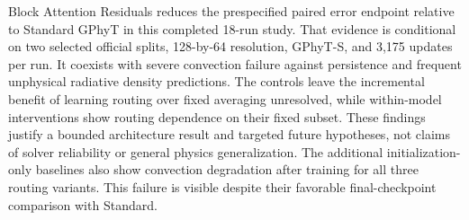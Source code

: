 Block Attention Residuals reduces the prespecified paired error endpoint relative to Standard GPhyT in this completed 18-run study. That evidence is conditional on two selected official splits, 128-by-64 resolution, GPhyT-S, and 3,175 updates per run. It coexists with severe convection failure against persistence and frequent unphysical radiative density predictions. The controls leave the incremental benefit of learning routing over fixed averaging unresolved, while within-model interventions show routing dependence on their fixed subset. These findings justify a bounded architecture result and targeted future hypotheses, not claims of solver reliability or general physics generalization.
The additional initialization-only baselines also show convection degradation after training for all three routing variants. This failure is visible despite their favorable final-checkpoint comparison with Standard.
